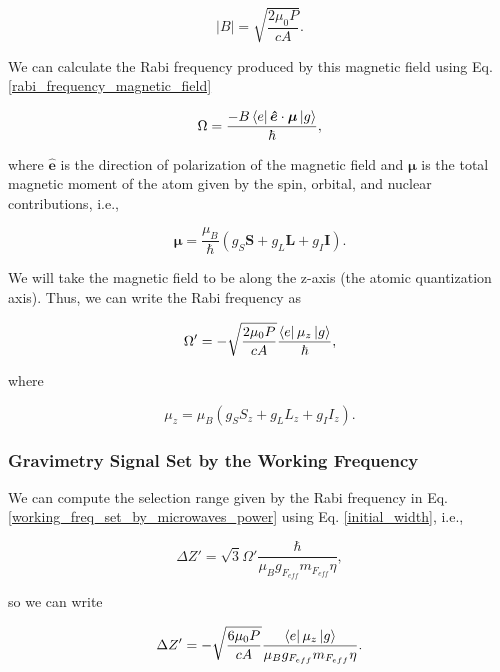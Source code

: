 \documentclass{article}
\begin{document}
\begin{equation}
    |B| = \sqrt{\frac{2 \mu_{0} P}{c A}}.
\end{equation}

We can calculate the Rabi frequency produced by this magnetic field using Eq. \ref{rabi_frequency_magnetic_field}

\begin{equation*}
\Omega = \frac{- B \bra{e} \boldsymbol{\hat{e}} \cdot \boldsymbol{\mu} \ket{g}}{\hbar},
\end{equation*}

where $\boldsymbol{\hat{e}}$ is the direction of polarization of the magnetic field and $\boldsymbol{\mu}$ is the total magnetic moment of the atom given by the spin, orbital, and nuclear contributions, i.e.,

\begin{equation}
     \boldsymbol{\mu} = \frac{\mu_{B}}{\hbar}(g_{S}\boldsymbol{S} + g_{L}\boldsymbol{L} + g_{I}\boldsymbol{I}).
\end{equation}

We will take the magnetic field to be along the z-axis (the atomic quantization axis). Thus, we can write the Rabi frequency as

\begin{equation}\label{working_freq_set_by_microwaves_power}
\Omega' = - \sqrt{\frac{2 \mu_{0} P}{c A}} \frac{\bra{e} \mu_{z} \ket{g}}{\hbar},
\end{equation}

where 

\begin{equation}
     \mu_{z} = \mu_{B}(g_{S}S_{z}+ g_{L}L_{z}+ g_{I}I_{z}).
\end{equation}

\subsubsection{Gravimetry Signal Set by the Working Frequency}
We can compute the selection range given by the Rabi frequency in Eq. \ref{working_freq_set_by_microwaves_power} using Eq. \ref{initial_width}, i.e.,

\begin{equation*}
\Delta Z' = \sqrt{3} \Omega' \frac{\hbar}{\mu_{B} g_{F_{eff}} m_{F_{eff}} \eta},
\end{equation*}

so we can write

\begin{equation}\label{maximum_selection_range}
\Delta Z' = - \sqrt{\frac{6 \mu_{0} P}{c A}} \frac{\bra{e} \mu_{z} \ket{g}}{\mu_{B} g_{F_{eff}} m_{F_{eff}} \eta}.
\end{equation}
\end{document}
